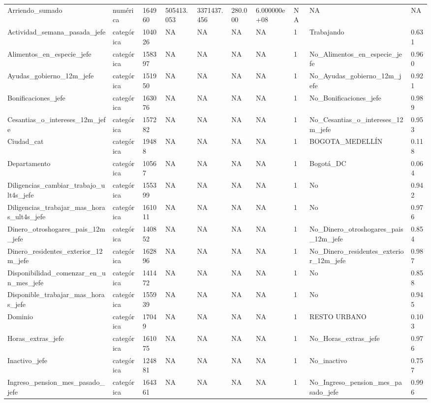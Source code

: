 \begin{longtable}[t]{llllllllll}
Arriendo\_sumado & numérica & 164960 & 505413.053 & 3371437.456 & 280.000 & 6.000000e+08 & NA & NA & NA\\
Actividad\_semana\_pasada\_jefe & categórica & 104026 & NA & NA & NA & NA & 1 & Trabajando & 0.631\\
Alimentos\_en\_especie\_jefe & categórica & 158397 & NA & NA & NA & NA & 1 & No\_Alimentos\_en\_especie\_jefe & 0.960\\
Ayudas\_gobierno\_12m\_jefe & categórica & 151950 & NA & NA & NA & NA & 1 & No\_Ayudas\_gobierno\_12m\_jefe & 0.921\\
Bonificaciones\_jefe & categórica & 163076 & NA & NA & NA & NA & 1 & No\_Bonificaciones\_jefe & 0.989\\
Cesantias\_o\_intereses\_12m\_jefe & categórica & 157282 & NA & NA & NA & NA & 1 & No\_Cesantias\_o\_intereses\_12m\_jefe & 0.953\\
Ciudad\_cat & categórica & 19488 & NA & NA & NA & NA & 1 & BOGOTA\_MEDELLÍN & 0.118\\
Departamento & categórica & 10567 & NA & NA & NA & NA & 1 & Bogotá\_DC & 0.064\\
Diligencias\_cambiar\_trabajo\_ult4s\_jefe & categórica & 155399 & NA & NA & NA & NA & 1 & No & 0.942\\
Diligencias\_trabajar\_mas\_horas\_ult4s\_jefe & categórica & 161011 & NA & NA & NA & NA & 1 & No & 0.976\\
Dinero\_otroshogares\_pais\_12m\_jefe & categórica & 140852 & NA & NA & NA & NA & 1 & No\_Dinero\_otroshogares\_pais\_12m\_jefe & 0.854\\
Dinero\_residentes\_exterior\_12m\_jefe & categórica & 162896 & NA & NA & NA & NA & 1 & No\_Dinero\_residentes\_exterior\_12m\_jefe & 0.987\\
Disponibilidad\_comenzar\_en\_un\_mes\_jefe & categórica & 141472 & NA & NA & NA & NA & 1 & No & 0.858\\
Disponible\_trabajar\_mas\_horas\_jefe & categórica & 155939 & NA & NA & NA & NA & 1 & No & 0.945\\
Dominio & categórica & 17049 & NA & NA & NA & NA & 1 & RESTO URBANO & 0.103\\
Horas\_extras\_jefe & categórica & 161075 & NA & NA & NA & NA & 1 & No\_Horas\_extras\_jefe & 0.976\\
Inactivo\_jefe & categórica & 124881 & NA & NA & NA & NA & 1 & No\_inactivo & 0.757\\
Ingreso\_pension\_mes\_pasado\_jefe & categórica & 164361 & NA & NA & NA & NA & 1 & No\_Ingreso\_pension\_mes\_pasado\_jefe & 0.996\\

\end{longtable}

